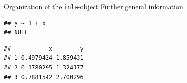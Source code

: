 \documentclass[
  handout]{beamer}
\newenvironment{Shaded}{\begin{snugshade}}{\end{snugshade}}
\newcommand{\CommentTok}[1]{\textcolor[rgb]{0.56,0.35,0.01}{\textit{#1}}}
\newcommand{\DecValTok}[1]{\textcolor[rgb]{0.00,0.00,0.81}{#1}}
\newcommand{\NormalTok}[1]{#1}
\newcommand{\SpecialCharTok}[1]{\textcolor[rgb]{0.00,0.00,0.00}{#1}}
\begin{document}
\begin{frame}[fragile]{Organization of the \texttt{inla}-object}
\protect\hypertarget{organization-of-the-inla-object-3}{}
Further general information

\begin{Shaded}
\end{Shaded}

\begin{verbatim}
## y ~ 1 + x
## NULL
\end{verbatim}

\begin{Shaded}
\end{Shaded}

\begin{verbatim}
##           x        y
## 1 0.4979424 1.859431
## 2 0.1780295 1.324177
## 3 0.7881542 2.700296
\end{verbatim}

\begin{Shaded}
\end{Shaded}
\end{frame}
\end{document}
